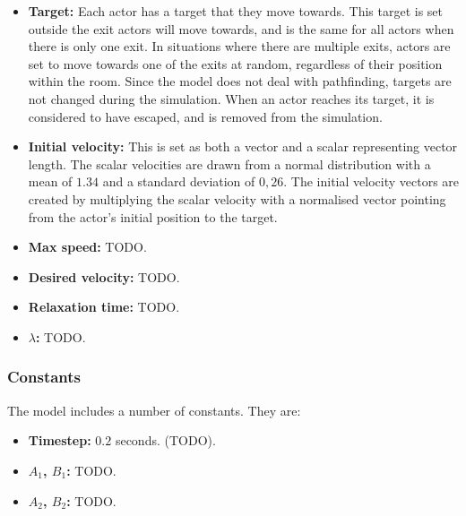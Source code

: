 \begin{itemize}
    \item \textbf{Target:} Each actor has a target that they move towards. 
        This target is set outside the exit actors will move towards, and is 
        the same for all actors when there is only one exit. In situations 
        where there are multiple exits, actors are set to move towards one of 
        the exits at random, regardless of their position within the room. 
        Since the model does not deal with pathfinding, targets are not 
        changed during the simulation. When an actor reaches its target, it is 
        considered to have escaped, and is removed from the simulation.

    \item \textbf{Initial velocity:} This is set as both a vector and a scalar 
        representing vector length. The scalar velocities are drawn from a 
        normal distribution with a mean of $1.34$ and a standard deviation of 
        $0,26$. The initial velocity vectors are created by multiplying the 
        scalar velocity with a normalised vector pointing from the actor's 
        initial position to the target.

    \item \textbf{Max speed:} TODO.

    \item \textbf{Desired velocity:} TODO.

    \item \textbf{Relaxation time:} TODO.

    \item \textbf{$\lambda$:} TODO.
\end{itemize}

\subsubsection{Constants}
The model includes a number of constants. They are:

\begin{itemize}
    \item \textbf{Timestep:} $0.2$ seconds. (TODO).

    \item \textbf{$A_1$, $B_1$:} TODO.

    \item \textbf{$A_2$, $B_2$:} TODO.
\end{itemize}

